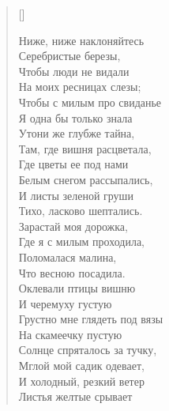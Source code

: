 \settowidth{\versewidth}{Чтобы с милым на свиданье}
\begin{verse}[\versewidth]
\begin{altverse}
Ниже, ниже наклоняйтесь\\
Серебристые березы,\\
Чтобы люди не видали\\
На моих ресницах слезы;\\
Чтобы с милым про свиданье\\
Я одна бы только знала\ldotst\\
Утони же глубже тайна,\\
Там, где вишня расцветала,\\
Где цветы ее под нами\\
Белым снегом рассыпались,\\
И листы зеленой груши\\
Тихо, ласково шептались.\\
Зарастай моя дорожка,\\
Где я с милым проходила,\\
Поломалася малина,\\
Что весною посадила.\\
Оклевали птицы вишню\\
И черемуху густую\ldotst\\
Грустно мне глядеть под вязы\\
На скамеечку пустую\ldotse\\
Солнце спряталось за тучку,\\
Мглой мой садик одевает,\\
И холодный, резкий ветер\\
Листья желтые срывает\ldotst\\
\end{altverse}
\end{verse}


\newpage
\vspace*{-2.5cm}


